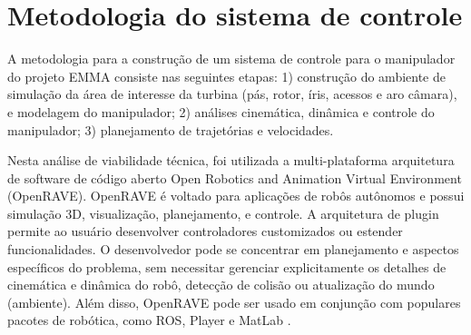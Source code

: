 \section{Metodologia do sistema de controle}
A metodologia para a construção de um sistema de controle para o manipulador do
projeto EMMA consiste nas seguintes etapas: 1) construção do ambiente de
simulação da área de interesse da turbina (pás, rotor, íris, acessos e aro
câmara), e modelagem do manipulador; 2) análises cinemática, dinâmica e
controle do manipulador; 3) planejamento de trajetórias e velocidades.

Nesta análise de viabilidade técnica, foi utilizada a 
multi-plataforma arquitetura de software de código aberto Open
Robotics and Animation Virtual Environment (OpenRAVE). OpenRAVE é voltado para
aplicações de robôs autônomos e possui simulação 3D, visualização, planejamento,
e controle. A arquitetura de plugin permite ao usuário desenvolver controladores
customizados ou estender funcionalidades. O desenvolvedor pode se
concentrar em planejamento e aspectos específicos do problema, sem necessitar
gerenciar explicitamente os detalhes de cinemática e dinâmica do robô,
detecção de colisão ou atualização do mundo (ambiente). Além disso, OpenRAVE
pode ser usado em conjunção com populares pacotes de robótica, como ROS, Player e MatLab
\cite{diankov2008openrave}. 









